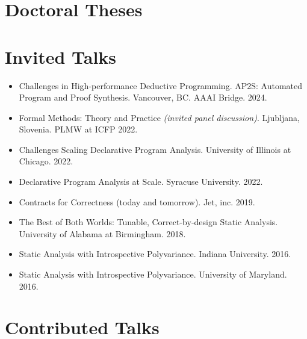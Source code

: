 \documentclass[line]{res}
\begin{document}
\begin{resume}
\section{\large Doctoral Theses} \vspace{0.3cm}

\vspace{-0.4cm}

\section{\large Invited Talks} \vspace{0.2in}
\begin{itemize}
\item Challenges in High-performance Deductive Programming. AP2S: Automated Program and Proof Synthesis. Vancouver, BC. AAAI Bridge. 2024. 
\item Formal Methods: Theory and Practice \textit{(invited panel discussion)}. Ljubljana, Slovenia. PLMW at ICFP 2022.
\item Challenges Scaling Declarative Program Analysis. University of Illinois at Chicago. 2022.
\item Declarative Program Analysis at Scale. Syracuse University. 2022.
\item Contracts for Correctness (today and tomorrow). Jet, inc. 2019.
\item The Best of Both Worlds: Tunable, Correct-by-design Static Analysis. University of Alabama at Birmingham. 2018.
\item Static Analysis with Introspective Polyvariance. Indiana University. 2016.
\item Static Analysis with Introspective Polyvariance. University of Maryland. 2016.
\end{itemize}

\section{\large Contributed Talks} \vspace{0.2in}



\end{resume}

\end{document}
